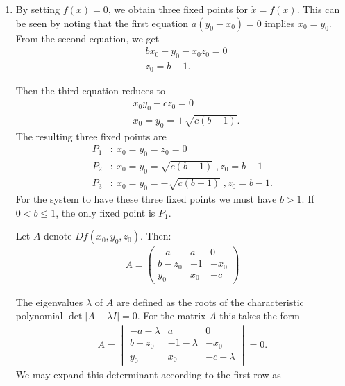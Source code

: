 \begin{solution}[3.5]
	\leavevmode
\begin{enumerate}
\item By setting $f(x)=0$, we obtain three fixed points for $\dot{x} = f(x)$. This can be seen by noting that the first equation $a(y_0 - x_0)=0$ implies $x_0 = y_0$. From the second equation, we get
\begin{align}
        &bx_0 - y_0 -x_0 z_0 = 0 \\
	&z_0 = b-1.
\end{align}

Then the third equation reduces to
\begin{align}
        &x_0y_0 - cz_0 = 0\\
        	&x_0=y_0 = \pm \sqrt{c(b-1)}.
\end{align}
The resulting three fixed points are
\begin{align}
	P_1 &:\ x_0 = y_0 = z_0 = 0\\
	P_2 &:\ x_0 = y_0 = \sqrt{c(b-1)} \;, z_0 = b-1 \\
	P_3 &:\ x_0 = y_0 = -\sqrt{c(b-1)} \;, z_0 = b-1.
\end{align}
For the system to have these three fixed points we must have $\boxed{b>1}$. If $0<b\leq1$, the only fixed point is $P_1$.

Let $A$ denote $Df(x_0,y_0,z_0)$. Then:
\begin{align}
	A = \begin{pmatrix}
		-a & a & 0 \\
		b-z_0 & -1 & -x_0 \\
		y_0 & x_0 & -c
	\end{pmatrix}
\end{align}

The eigenvalues $\lambda$ of $A$ are defined as the roots of the characteristic polynomial $\det |A - \lambda I |=0.$
For the matrix $A$ this takes the form
\begin{align}
	A = \begin{vmatrix}
		-a-\lambda & a & 0 \\
		b-z_0 & -1-\lambda & -x_0 \\
		y_0 & x_0 & -c-\lambda
	\end{vmatrix} = 0.
\end{align}
We may expand this determinant according to the first row as


\end{enumerate}
\end{solution}
